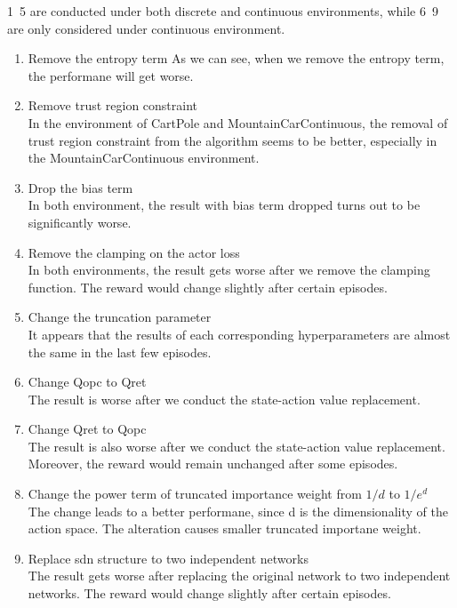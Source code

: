 1~5 are conducted under both discrete and continuous environments, while 6~9 are only considered under continuous environment.
\begin{enumerate}
    \item Remove the entropy term 
    As we can see, when we remove the entropy term, the performane will get worse. 
    \item Remove trust region constraint\\
    In the environment of CartPole and MountainCarContinuous, the removal of trust region constraint from the algorithm seems to be better, especially in the MountainCarContinuous environment. 
    \item Drop the bias term\\
    In both environment, the result with bias term dropped turns out to be significantly worse. 
    \item Remove the clamping on the actor loss\\
    In both environments, the result gets worse after we remove the clamping function. The reward would change slightly after certain episodes.
    \item Change the truncation parameter\\
    It appears that the results of each corresponding hyperparameters are almost the same in the last few episodes. 
    \item Change Qopc to Qret\\
    The result is worse after we conduct the state-action value replacement.
    \item Change Qret to Qopc\\
    The result is also worse after we conduct the state-action value replacement. Moreover, the reward would remain unchanged after some episodes.
    \item Change the power term of truncated importance weight from $1/d$ to $1/e^d$\\
    The change leads to a better performane, since d is the dimensionality of the action space. The alteration causes smaller truncated importane weight.
    \item Replace sdn structure to two independent networks\\
    The result gets worse after replacing the original network to two independent networks. The reward would change slightly after certain episodes.
\end{enumerate}
